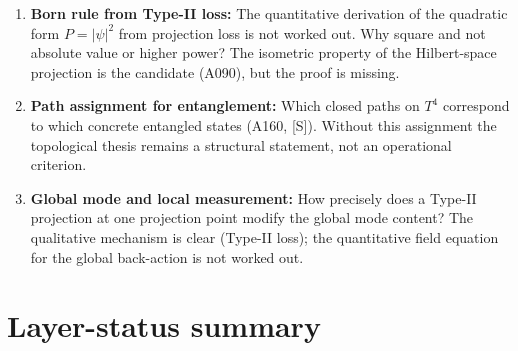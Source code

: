 \begin{enumerate}[leftmargin=1.6em,itemsep=0.3em]
  \item \textbf{Born rule from Type-II loss:} The quantitative
    derivation of the quadratic form $P = |\psi|^2$ from projection
    loss is not worked out. Why square and not absolute value or higher
    power? The isometric property of the Hilbert-space projection is
    the candidate (A090), but the proof is missing.
  \item \textbf{Path assignment for entanglement:} Which closed paths
    on $T^4$ correspond to which concrete entangled states (A160, [S]).
    Without this assignment the topological thesis remains a structural
    statement, not an operational criterion.
  \item \textbf{Global mode and local measurement:} How precisely does
    a Type-II projection at one projection point modify the global mode
    content? The qualitative mechanism is clear (Type-II loss); the
    quantitative field equation for the global back-action is not worked out.
\end{enumerate}

\section{Layer-status summary}

